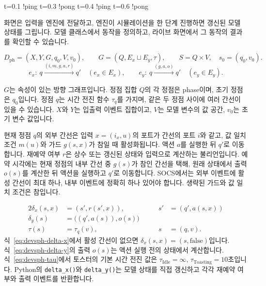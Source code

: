 \documentclass[11pt,a4paper]{article}
\newcommand{\api}[1]{\texttt{#1}}
\newcommand{\chaptermark}[1]{\par\noindent{\LARGE\color{ink}\bfseries #1}\par\smallskip}
\newcommand{\topic}[1]{\par\medskip{\large\color{accent}\bfseries #1}\par}
\begin{document}
\begin{Code}
t=0.1  !ping
t=0.3  !pong
t=0.4  !ping
t=0.6  !pong
\end{Code}
\topic{라이브 화면의 역할}
화면은 입력을 엔진에 전달하고, 엔진이 시뮬레이션을 한 단계 진행하면 갱신된
모델 상태를 그립니다. 모델 클래스에서 동작을 정의하고, 라이브 화면에서 그
동작의 결과를 확인할 수 있습니다.

\newpage
\chaptermark{2.2 \enspace DEVSph}
\begin{equation}\label{eq:devsph}
D_{\mathrm{ph}}=(X,Y,G,q_0,V,v_0),
\qquad G=(Q,E_x\sqcup E_y,\tau),
\qquad S=Q\times V,\quad s_0=(q_0,v_0).
\end{equation}
\begin{equation}\label{eq:devsph-edges}
e_x:\ q\xrightarrow{(i,m,g,a,r)}q'\quad(e_x\in E_x),
\qquad
e_y:\ q\xrightarrow{(g,a,o)}q'\quad(e_y\in E_y).
\end{equation}

$G$는 속성이 있는 방향 그래프입니다. 정점 집합 $Q$의 각 정점은
phase이며, 초기 정점은 $q_0$입니다. 정점 $q$는 시간 전진 함수
$\tau_q$를 가지며, 같은 두 정점 사이에 여러 간선이 있을 수 있습니다.
$X$와 $Y$는 입출력 이벤트 집합이고, $V$는 모델 변수의 값 공간,
$v_0$는 초기 변수 값입니다.

현재 정점 $q$의 외부 간선은 입력 $x=(i_x,u)$의 포트가 간선의
포트 $i$와 같고, 값 일치 조건 $m(u)$와 가드 $g(s,x)$가 참일 때
활성화됩니다. 액션 $a$를 실행한 뒤 $q'$로 이동합니다. 재예약 여부
$r$은 상수 또는 갱신된 상태와 입력으로 계산하는 불리언입니다.
예약 시각에는 현재 정점의 내부 간선 중 $g(s)$가 참인 간선을 택해,
원래 상태에서 출력 $o(s)$를 계산한 뒤 액션을 실행하고 $q'$로 이동합니다.
SOCS에서는 외부 이벤트에 활성 간선이 최대 하나, 내부 이벤트에
정확히 하나 있어야 합니다. 생략된 가드와 값 일치 조건은 참입니다.

\begin{alignat}{2}
\delta_x(s,x) &= (s',r(s',x)), &\qquad s' &= (q',a(s,x))
  \label{eq:devsph-delta-x}\\
\delta_y(s)   &= \bigl((q',a(s)),o(s)\bigr)
  \label{eq:devsph-delta-y}\\
\tau(s)       &= \tau_q(v), &\qquad s &= (q,v).
  \label{eq:devsph-tau}
\end{alignat}
식~\eqref{eq:devsph-delta-x}에서 활성 간선이 없으면 $\delta_x(s,x)=(s,\mathrm{false})$입니다. 식~\eqref{eq:devsph-delta-y}의 출력 $o(s)$는 액션 실행 전의 상태에서 계산합니다. 식~\eqref{eq:devsph-tau}에서 토스터의 기본 시간 전진 값은 $\tau_{\mathrm{Idle}}=\infty$, $\tau_{\mathrm{Toasting}}=10$초입니다. Python의 \api{delta\_x()}와 \api{delta\_y()}는 모델 상태를 직접 갱신하고 각각 재예약 여부와 출력 이벤트를 반환합니다.
\end{document}
